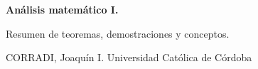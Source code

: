 \begin{titlepage}
    \begin{center}
        \vspace*{1cm}
            
        \Huge
        \textbf{Análisis matemático I.}
            
        \vspace{0.5cm}
        \LARGE
        Resumen de teoremas, demostraciones y conceptos.
            
        \vspace{1.5cm}
            
            
        \vfill
            
        \vspace{0.8cm}
            
            
        \Large
        CORRADI, Joaquín I.
        Universidad Católica de Córdoba\\
            
    \end{center}
\end{titlepage}
